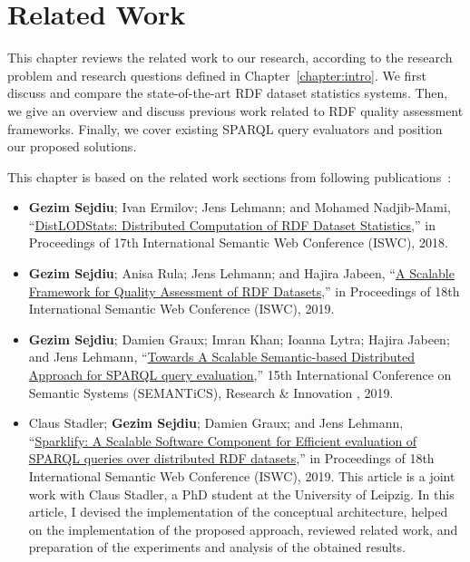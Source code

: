 \chapter{Related Work}
\label{chapter:related}

This chapter reviews the related work to our research, according to the research problem and research questions defined in Chapter~\ref{chapter:intro}.
We first discuss and compare the state-of-the-art \gls{RDF} dataset statistics systems.
Then, we give an overview and discuss previous work related to \gls{RDF} quality assessment frameworks. 
Finally, we cover existing \gls{SPARQL} query evaluators and position our proposed solutions. 

This chapter is based on the related work sections from following publications~\cite{sejdiu-2018-dist-lod-stats-iswc,sejdiu-2019-sansa-dist-quality-assessment-iswc,sejdiu-2019-sansa-semantic-based-semantics, 2019-sansa-sparklify-iswc}:

\begin{itemize}
    \item \textbf{Gezim Sejdiu}; Ivan Ermilov; Jens Lehmann; and Mohamed Nadjib-Mami, “\href{http://jens-lehmann.org/files/2018/iswc_distlodstats.pdf}{DistLODStats: Distributed Computation of RDF Dataset Statistics},” in Proceedings of 17th International Semantic Web Conference (ISWC), 2018.

    \item \textbf{Gezim Sejdiu}; Anisa Rula; Jens Lehmann; and Hajira Jabeen, “\href{http://jens-lehmann.org/files/2019/iswc_dist_quality_assessment.pdf}{A Scalable Framework for Quality Assessment of RDF Datasets},” in Proceedings of 18th International Semantic Web Conference (ISWC), 2019.

    \item \textbf{Gezim Sejdiu}; Damien Graux; Imran Khan; Ioanna Lytra; Hajira Jabeen; and Jens Lehmann, “\href{https://gezimsejdiu.github.io/publications/semantic_based_query_paper_SEMANTICS2019.pdf}{Towards A Scalable Semantic-based Distributed Approach for SPARQL query evaluation},” 15th International Conference on Semantic Systems (SEMANTiCS), Research \& Innovation , 2019.

    \item Claus Stadler; \textbf{Gezim Sejdiu}; Damien Graux; and Jens Lehmann, “\href{http://jens-lehmann.org/files/2019/iswc_sparklify.pdf}{Sparklify: A Scalable Software Component for Efficient evaluation of SPARQL queries over distributed RDF datasets},” in Proceedings of 18th International Semantic Web Conference (ISWC), 2019.
    This article is a joint work with Claus Stadler, a PhD student at the University of Leipzig. 
    In this article, I devised the implementation of the conceptual architecture, helped on the implementation of the proposed approach, reviewed related work, and preparation of the experiments and analysis of the obtained results.
    
\end{itemize}

